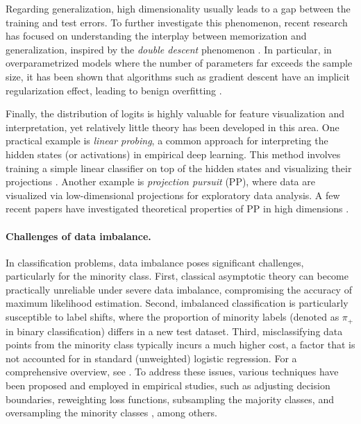 Regarding generalization, high dimensionality usually leads to a gap between the training and test errors. To further investigate this phenomenon, recent research has focused on understanding the interplay between memorization and generalization, inspired by the \textit{double descent} phenomenon \cite{belkin2019reconciling}. In particular, in overparametrized models where the number of parameters far exceeds the sample size, it has been shown that algorithms such as gradient descent have an implicit regularization effect, leading to benign overfitting \cite{bartlett2020benign}.

Finally, the distribution of logits is highly valuable for feature visualization and interpretation, yet relatively little theory has been developed in this area. One practical example is \textit{linear probing}, a common approach for interpreting the hidden states (or activations) in empirical deep learning. This method involves training a simple linear classifier on top of the hidden states and visualizing their projections \cite{kornblith2019better, he2020momentum, kumar2022fine}. Another example is \textit{projection pursuit} (PP), where data are visualized via low-dimensional projections for exploratory data analysis. A few recent papers have investigated theoretical properties of PP in high dimensions \cite{Bickel_high_dim_PP, montanari2022overparametrizedlineardimensionalityreductions}.


\paragraph{Challenges of data imbalance.} In classification problems, data imbalance poses significant challenges, particularly for the minority class. First, classical asymptotic theory can become practically unreliable under severe data imbalance, compromising the accuracy of maximum likelihood estimation. Second, imbalanced classification is particularly susceptible to label shifts, where the proportion of minority labels (denoted as $\pi_+$ in binary classification) differs in a new test dataset. Third, misclassifying data points from the minority class typically incurs a much higher cost, a factor that is not accounted for in standard (unweighted) logistic regression. For a comprehensive overview, see \cite{he2009learning}. To address these issues, various techniques have been proposed and employed in empirical studies, such as adjusting decision boundaries, reweighting loss functions, subsampling the majority classes, and oversampling the minority classes \cite{king2001logistic, chawla2002smote}, among others.

